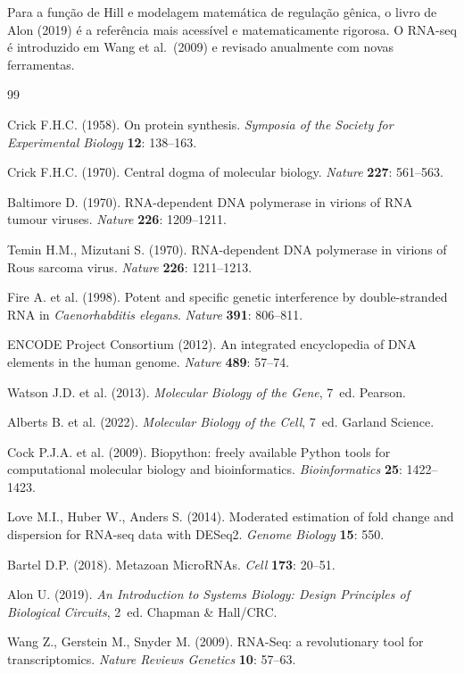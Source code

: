 Para a função de Hill e modelagem matemática de regulação gênica, o livro de Alon (2019)
\cite{alon2019} é a referência mais acessível e matematicamente rigorosa. O RNA-seq é
introduzido em Wang et al.\ (2009) \cite{wang2009} e revisado anualmente com novas
ferramentas.

\begin{thebibliography}{99}

Crick F.H.C. (1958).
On protein synthesis.
\textit{Symposia of the Society for Experimental Biology} \textbf{12}: 138--163.

Crick F.H.C. (1970).
Central dogma of molecular biology.
\textit{Nature} \textbf{227}: 561--563.

Baltimore D. (1970).
RNA-dependent DNA polymerase in virions of RNA tumour viruses.
\textit{Nature} \textbf{226}: 1209--1211.

Temin H.M., Mizutani S. (1970).
RNA-dependent DNA polymerase in virions of Rous sarcoma virus.
\textit{Nature} \textbf{226}: 1211--1213.

Fire A. et al. (1998).
Potent and specific genetic interference by double-stranded RNA in
\textit{Caenorhabditis elegans}.
\textit{Nature} \textbf{391}: 806--811.

ENCODE Project Consortium (2012).
An integrated encyclopedia of DNA elements in the human genome.
\textit{Nature} \textbf{489}: 57--74.

Watson J.D. et al. (2013).
\textit{Molecular Biology of the Gene}, 7\textordfeminine\ ed.
Pearson.

Alberts B. et al. (2022).
\textit{Molecular Biology of the Cell}, 7\textordfeminine\ ed.
Garland Science.

Cock P.J.A. et al. (2009).
Biopython: freely available Python tools for computational molecular biology
and bioinformatics.
\textit{Bioinformatics} \textbf{25}: 1422--1423.

Love M.I., Huber W., Anders S. (2014).
Moderated estimation of fold change and dispersion for RNA-seq data with DESeq2.
\textit{Genome Biology} \textbf{15}: 550.

Bartel D.P. (2018).
Metazoan MicroRNAs.
\textit{Cell} \textbf{173}: 20--51.

Alon U. (2019).
\textit{An Introduction to Systems Biology: Design Principles of Biological Circuits},
2\textordfeminine\ ed.
Chapman \& Hall/CRC.

Wang Z., Gerstein M., Snyder M. (2009).
RNA-Seq: a revolutionary tool for transcriptomics.
\textit{Nature Reviews Genetics} \textbf{10}: 57--63.

\end{thebibliography}
